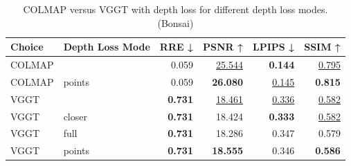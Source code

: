 \begin{table}[H]
\caption{\ifdefined\customcaption \customcaption \else COLMAP versus VGGT with depth loss for different depth loss modes. (Bonsai) \fi}
\label{tab:05_depth_loss_mode_brief_bonsai}
\centering
\scriptsize
\begin{tabular}{llrrrr}
\toprule
Choice & Depth Loss Mode & RRE ↓ & PSNR ↑ & LPIPS ↓ & SSIM ↑ \\
\midrule
COLMAP &  & 0.059 & \underline{25.544} & \textbf{0.144} & \underline{0.795} \\
COLMAP & points & 0.059 & \textbf{26.080} & \underline{0.145} & \textbf{0.815} \\
\midrule
VGGT &  & \textbf{0.731} & \underline{18.461} & \underline{0.336} & \underline{0.582} \\
VGGT & closer & \textbf{0.731} & 18.424 & \textbf{0.333} & \underline{0.582} \\
VGGT & full & \textbf{0.731} & 18.286 & 0.347 & 0.579 \\
VGGT & points & \textbf{0.731} & \textbf{18.555} & 0.346 & \textbf{0.586} \\
\bottomrule
\end{tabular}
\end{table}